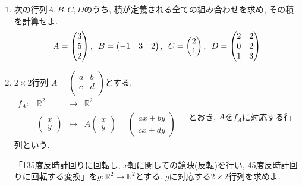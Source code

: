 \documentclass[dvipdfmx,a4paper,11pt]{article}
\newcommand{\R}{\mathbb{R}}
\theoremstyle{definition}
\begin{document}
  \begin{enumerate}[label={\Large \textbf{第}\arabic*\textbf{問}.}]
 
\item 次の行列$A,B,C,D$のうち, 積が定義される全ての組み合わせを求め, その積を計算せよ.
 $$
  A= \begin{pmatrix} %
 3\\
 5 \\
 2\\
 \end{pmatrix} %
 \text{, \,\,} 
B= 
 \begin{pmatrix} %
 -1& 3&2 \\
 \end{pmatrix}  
 \text{, \,\,} 
 C=
 \begin{pmatrix}
 2 \\
1  \\
 \end{pmatrix}
  \text{, \,\,} 
 D=
   \begin{pmatrix}
 2 &2 \\
0 &2 \\
1&3 \\
 \end{pmatrix}
 $$
 
 \item $2 \times 2$行列
$
A=\begin{pmatrix}
a& b \\
c& d \\
\end{pmatrix}
$とする. 
 $
\begin{array}{ccccc}
f_A: &\R^2& \rightarrow & \R^2& \\
&\begin{pmatrix}
x \\ y
 \end{pmatrix} & \longmapsto & 
A
\begin{pmatrix}
x \\ y
 \end{pmatrix}  = 
 \begin{pmatrix}
ax + by \\ cx + dy
 \end{pmatrix}
 &
\end{array}
$
とおき, $A$を$f_A$に対応する行列という. 

 「135度反時計回りに回転し, $x$軸に関しての鏡映(反転)を行い, 45度反時計回りに回転する変換」を$g : \R^2 \to \R^2$とする. $g$に対応する$2 \times 2$行列を求めよ.  
  


\end{enumerate}
\end{document}
